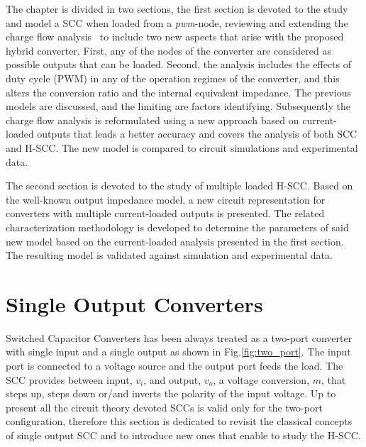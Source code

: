 The chapter is divided in two sections, the first section is devoted to the study and model a SCC when loaded from a \emph{pwm}-node, reviewing and extending the charge flow analysis~\cite{95Makowski,Seeman:EECS-2009-78} to include two new aspects that arise with the proposed hybrid converter. First, any of the nodes of the converter are considered as possible outputs that can be loaded. Second, the analysis includes the effects of duty cycle (PWM) in any of the operation regimes of the converter, and this alters the conversion ratio and the internal equivalent impedance. The previous models are discussed, and the limiting are factors identifying. Subsequently the charge flow analysis is reformulated using a new approach based on current-loaded outputs that leads a better accuracy and covers the analysis of both SCC and H-SCC. The new model is compared to circuit simulations and experimental data. 

The second section is devoted to the study of multiple loaded H-SCC. Based on the well-known output impedance model, a new circuit representation for converters with multiple current-loaded outputs is presented. The related characterization methodology is developed to determine the parameters of said new model based on the current-loaded analysis presented in the first section. The resulting model is validated against simulation and experimental data. 


\section{Single Output Converters}
Switched Capacitor Converters has been always treated as a two-port converter with single input and a single output as shown in Fig.\ref{fig:two_port}. The input port is connected to a voltage source and the output port feeds the load. The SCC provides between input, $v_i$, and output, $v_o$, a voltage conversion, $m$,  that  steps up, steps down or/and inverts the polarity of the input voltage. Up to present all the circuit theory devoted SCCs is valid only for the two-port configuration, therefore this section is dedicated to revisit the classical concepts of single output SCC and to introduce new ones that enable to study the H-SCC.

